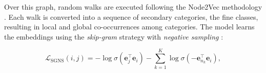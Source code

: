 Over this graph, random walks are executed following the Node2Vec methodology \cite{grover2016node2vec}.
Each walk is converted into a sequence of secondary categories, the fine classes, resulting in local and global co-occurrences among categories. The model learns the embeddings using the \textit{skip-gram} strategy with \textit{negative sampling} \cite{mikolov2013word2vec,mikolov2013negsampling}:

\[
\mathcal{L}_{\text{SGNS}}(i,j)
=
-\log \sigma\!\left(\mathbf{e}_j^\top \mathbf{e}_i\right)
-
\sum_{k=1}^{K}
\log \sigma\!\left(-\mathbf{e}_{n_k}^\top \mathbf{e}_i\right),
\]

